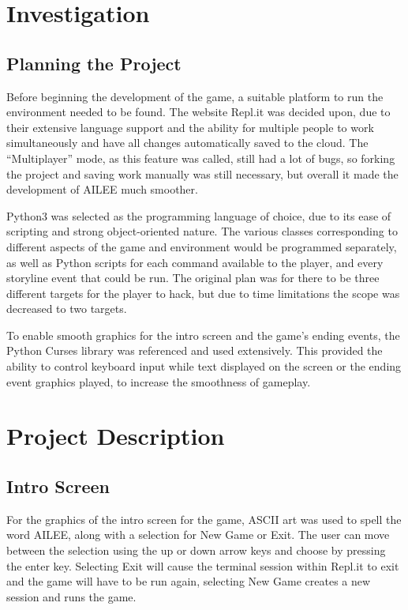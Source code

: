 \documentclass[conference]{IEEEtran}
\begin{document}
\section{Investigation}

\subsection{Planning the Project}

Before beginning the development of the game, a suitable platform to run the environment needed to be found. The website Repl.it was decided upon, due to their extensive language support and the ability for multiple people to work simultaneously and have all changes automatically saved to the cloud. \cite{b1} The “Multiplayer” mode, as this feature was called, still had a lot of bugs, so forking the project and saving work manually was still necessary, but overall it made the development of AILEE much smoother. 

Python3 was selected as the programming language of choice, due to its ease of scripting and strong object-oriented nature. The various classes corresponding to different aspects of the game and environment would be programmed separately, as well as Python scripts for each command available to the player, and every storyline event that could be run. The original plan was for there to be three different targets for the player to hack, but due to time limitations the scope was decreased to two targets.
    
To enable smooth graphics for the intro screen and the game’s ending events, the Python Curses library was referenced and used extensively. \cite{b2} This provided the ability to control keyboard input while text displayed on the screen or the ending event graphics played, to increase the smoothness of gameplay. 

\section{Project Description}

\subsection{Intro Screen}\label{AA}
For the graphics of the intro screen for the game, ASCII art was used to spell the word AILEE, along with a selection for New Game or Exit. The user can move between the selection using the up or down arrow keys and choose by pressing the enter key. Selecting Exit will cause the terminal session within Repl.it to exit and the game will have to be run again, selecting New Game creates a new session and runs the game. 
\end{document}
